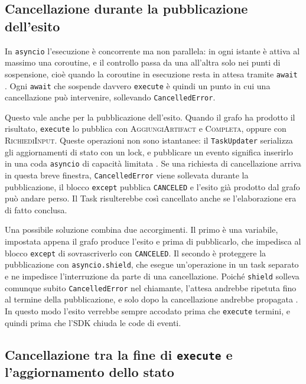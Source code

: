\subsection{Cancellazione durante la pubblicazione dell'esito}

In \texttt{asyncio} l'esecuzione è concorrente ma non parallela: in ogni istante è attiva al massimo una coroutine, e il controllo passa da una all'altra solo nei punti di sospensione, cioè quando la coroutine in esecuzione resta in attesa tramite \texttt{await} \cite{pythonasynciotask}. Ogni \texttt{await} che sospende davvero \texttt{execute} è quindi un punto in cui una cancellazione può intervenire, sollevando \texttt{CancelledError}.

Questo vale anche per la pubblicazione dell'esito. Quando il grafo ha prodotto il risultato, \texttt{execute} lo pubblica con \textsc{AggiungiArtifact} e \textsc{Completa}, oppure con \textsc{RichiediInput}. Queste operazioni non sono istantanee: il \texttt{TaskUpdater} serializza gli aggiornamenti di stato con un lock, e pubblicare un evento significa inserirlo in una coda \texttt{asyncio} di capacità limitata \cite{a2apythonsdk}. Se una richiesta di cancellazione arriva in questa breve finestra, \texttt{CancelledError} viene sollevata durante la pubblicazione, il blocco \texttt{except} pubblica \texttt{CANCELED} e l'esito già prodotto dal grafo può andare perso. Il Task risulterebbe così cancellato anche se l'elaborazione era di fatto conclusa.

Una possibile soluzione combina due accorgimenti. Il primo è una variabile, impostata appena il grafo produce l'esito e prima di pubblicarlo, che impedisca al blocco \texttt{except} di sovrascriverlo con \texttt{CANCELED}. Il secondo è proteggere la pubblicazione con \texttt{asyncio.shield}, che esegue un'operazione in un task separato e ne impedisce l'interruzione da parte di una cancellazione. Poiché \texttt{shield} solleva comunque subito \texttt{CancelledError} nel chiamante, l'attesa andrebbe ripetuta fino al termine della pubblicazione, e solo dopo la cancellazione andrebbe propagata \cite{pythonasynciotask}. In questo modo l'esito verrebbe sempre accodato prima che \texttt{execute} termini, e quindi prima che l'SDK chiuda le code di eventi.

\subsection{Cancellazione tra la fine di \texorpdfstring{\texttt{execute}}{execute} e l'aggiornamento dello stato}

